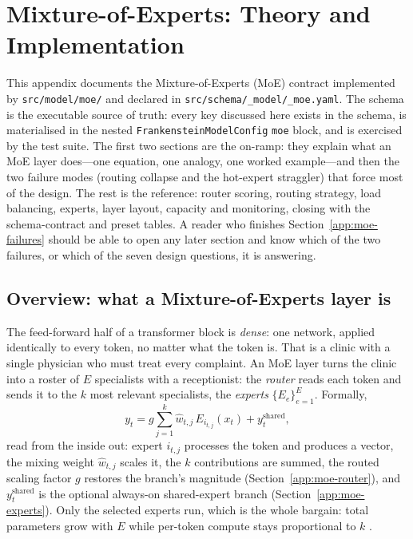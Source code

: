 \section{Mixture-of-Experts: Theory and Implementation}
\label{app:moe}

This appendix documents the Mixture-of-Experts (MoE) contract implemented by
\texttt{src/model/moe/} and declared in
\texttt{src/schema/\_model/\_moe.yaml}. The schema is the executable source of
truth: every key discussed here exists in the schema, is materialised in the
nested \texttt{FrankensteinModelConfig} \texttt{moe} block, and is exercised by
the test suite. The first two sections are the on-ramp: they explain what an
MoE layer does---one equation, one analogy, one worked example---and then the
two failure modes (routing collapse and the hot-expert straggler) that force
most of the design. The rest is the reference: router scoring, routing
strategy, load balancing, experts, layer layout, capacity and monitoring,
closing with the schema-contract and preset tables. A reader who finishes
Section~\ref{app:moe-failures} should be able to open any later section and
know which of the two failures, or which of the seven design questions, it is
answering.

\subsection{Overview: what a Mixture-of-Experts layer is}
\label{app:moe-overview}

The feed-forward half of a transformer block is \emph{dense}: one network,
applied identically to every token, no matter what the token is. That is a
clinic with a single physician who must treat every complaint. An MoE layer
turns the clinic into a roster of $E$ specialists with a receptionist: the
\emph{router} reads each token and sends it to the $k$ most relevant
specialists, the \emph{experts} $\{E_e\}_{e=1}^{E}$. Formally,
\begin{equation}
  y_t = g \sum_{j=1}^{k} \hat w_{t,j}\, E_{i_{t,j}}(x_t) + y^{\text{shared}}_t ,
  \label{eq:moe-layer}
\end{equation}
read from the inside out: expert $i_{t,j}$ processes the token and produces a
vector, the mixing weight $\hat w_{t,j}$ scales it, the $k$ contributions are
summed, the routed scaling factor $g$ restores the branch's magnitude
(Section~\ref{app:moe-router}), and $y^{\text{shared}}_t$ is the optional
always-on shared-expert branch (Section~\ref{app:moe-experts}). Only the
selected experts run, which is the whole bargain: total parameters grow with
$E$ while per-token compute stays proportional to $k$
\citep{shazeer2017moe,fedus2021switch}.

